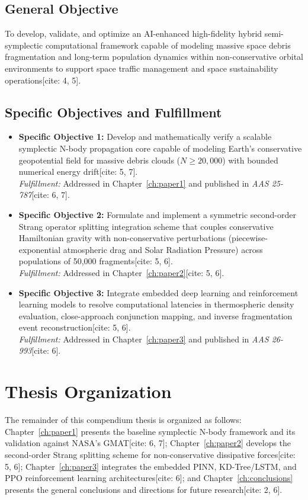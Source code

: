 \documentclass[12pt,letterpaper,twoside]{book}
\begin{document}
\subsection{General Objective}
To develop, validate, and optimize an AI-enhanced high-fidelity hybrid semi-symplectic computational framework capable of modeling massive space debris fragmentation and long-term population dynamics within non-conservative orbital environments to support space traffic management and space sustainability operations[cite: 4, 5].

\subsection{Specific Objectives and Fulfillment}
\begin{itemize}
    \item \textbf{Specific Objective 1:} Develop and mathematically verify a scalable symplectic N-body propagation core capable of modeling Earth's conservative geopotential field for massive debris clouds ($N \ge 20,000$) with bounded numerical energy drift[cite: 5, 7]. \\
    \textit{Fulfillment:} Addressed in Chapter~\ref{ch:paper1} and published in \textit{AAS 25-787}[cite: 6, 7].
    
    \item \textbf{Specific Objective 2:} Formulate and implement a symmetric second-order Strang operator splitting integration scheme that couples conservative Hamiltonian gravity with non-conservative perturbations (piecewise-exponential atmospheric drag and Solar Radiation Pressure) across populations of 50,000 fragments[cite: 5, 6]. \\
    \textit{Fulfillment:} Addressed in Chapter~\ref{ch:paper2}[cite: 5, 6].
    
    \item \textbf{Specific Objective 3:} Integrate embedded deep learning and reinforcement learning models to resolve computational latencies in thermospheric density evaluation, close-approach conjunction mapping, and inverse fragmentation event reconstruction[cite: 5, 6]. \\
    \textit{Fulfillment:} Addressed in Chapter~\ref{ch:paper3} and published in \textit{AAS 26-993}[cite: 6].
\end{itemize}

\section{Thesis Organization}
The remainder of this compendium thesis is organized as follows: Chapter~\ref{ch:paper1} presents the baseline symplectic N-body framework and its validation against NASA's GMAT[cite: 6, 7]; Chapter~\ref{ch:paper2} develops the second-order Strang splitting scheme for non-conservative dissipative forces[cite: 5, 6]; Chapter~\ref{ch:paper3} integrates the embedded PINN, KD-Tree/LSTM, and PPO reinforcement learning architectures[cite: 6]; and Chapter~\ref{ch:conclusions} presents the general conclusions and directions for future research[cite: 2, 6].
\end{document}
